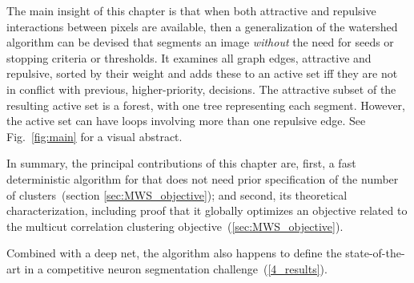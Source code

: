 The main insight of this chapter is that when both attractive and repulsive interactions between pixels are available, then a generalization of the watershed algorithm can be devised that segments an image {\em without} the need for seeds or stopping criteria or thresholds. It examines all graph edges, attractive and repulsive, sorted by their weight and adds these to an active set iff they are not in conflict with previous, higher-priority, decisions. The attractive subset of the resulting active set  is a forest, with one tree representing each segment. However, the active set can have loops involving more than one repulsive edge.
 See Fig.~\ref{fig:main} for a visual abstract. 

In summary, the principal contributions of this chapter are, first, 
a fast deterministic algorithm for  that does not need prior specification of the number of clusters~(section \ref{sec:MWS_objective}); and second, its theoretical characterization, including proof that it globally optimizes an objective related to the multicut correlation clustering objective~(\ref{sec:MWS_objective}).

Combined with a deep net, the algorithm also happens to define the state-of-the-art in a competitive neuron segmentation challenge~(\autoref{4_results}).



